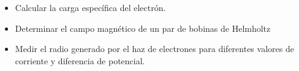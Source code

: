 \begin{itemize}
    \item Calcular la carga específica del electrón.
    \item Determinar el campo magnético de un par de bobinas de Helmholtz
    \item Medir el radio generado por el haz de electrones para diferentes valores de corriente y diferencia de potencial.
\end{itemize}
